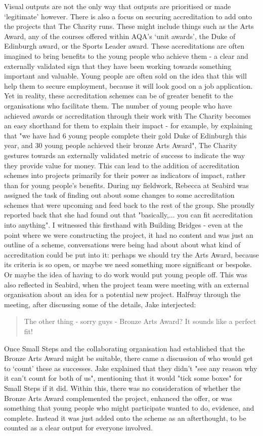 Visual outputs are not the only way that outputs are prioritised or made `legitimate' however. There is also a focus on securing accreditation to add onto the projects that The Charity runs. These might include things such as the Arts Award, any of the courses offered within AQA's `unit awards', the Duke of Edinburgh award, or the Sports Leader award. These accreditations are often imagined to bring benefits to the young people who achieve them - a clear and externally validated sign that they have been working towards something important and valuable. Young people are often sold on the idea that this will help them to secure employment, because it will look good on a job application. Yet in reality, these accreditation schemes can be of greater benefit to the organisations who facilitate them. The number of young people who have achieved awards or accreditation through their work with The Charity becomes an easy shorthand for them to explain their impact - for example, by explaining that "we have had 6 young people complete their gold Duke of Edinburgh this year, and 30 young people achieved their bronze Arts Award", The Charity gestures towards an externally validated metric of success to indicate the way they provide value for money. This can lead to the addition of accreditation schemes into projects primarily for their power as indicators of impact, rather than for young people's benefits. During my fieldwork, Rebecca at Seabird was assigned the task of finding out about some changes to some accreditation schemes that were upcoming and feed back to the rest of the group. She proudly reported back that she had found out that "basically,... you can fit accreditation into anything". I witnessed this firsthand with Building Bridges - even at the point where we were constructing the project, it had no content and was just an outline of a scheme,  conversations were being had about about what kind of accreditation could be put into it: perhaps we should try the Arts Award, because its criteria is so open, or maybe we need something more significant or bespoke. Or maybe the idea of having to do work would put young people off.  This was also reflected in Seabird, when the project team were meeting with an external organisation about an idea for a potential new project. Halfway through the meeting, after discussing some of the details, Jake interjected:
\begin{quote}
The other thing - sorry guys - Bronze Arts Award? It sounds like a perfect fit!    
\end{quote}
Once Small Steps and the collaborating organisation had established that the Bronze Arts Award might be suitable, there came a discussion of who would get to `count' these as successes. Jake explained that they didn't "see any reason why it can't count for both of us",  mentioning that it would "tick some boxes" for Small Steps if it did. Within this, there was no consideration of whether the Bronze Arts Award complemented the project, enhanced the offer, or was something that young people who might participate wanted to do, evidence, and complete. Instead it was just added onto the scheme as an afterthought, to be counted as a clear output for everyone involved.

